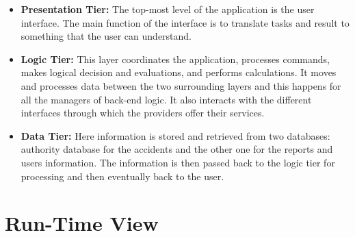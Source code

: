\documentclass[../RASD.tex]{subfiles}
\begin{document}
    \begin{itemize}
        \item \textbf{Presentation Tier:} The top-most level of the application is the user interface.
        The main function of the interface is to translate tasks and result to something that the user can understand.
        \item \textbf{Logic Tier:} This layer coordinates the application, processes commands, makes logical decision and evaluations, and performs calculations.
        It moves and processes data between the two surrounding layers and this happens for all the managers of back-end logic.
        It also interacts with the different interfaces through which the providers offer their services.
        \item \textbf{Data Tier:} Here information is stored and retrieved from two databases: authority database for the accidents and the other one
        for the reports and users information.
        The information is then passed back to the logic tier for processing and then eventually back to the user.
    \end{itemize}
    \newpage
    \section{Run-Time View}\label{sec:run-time-view}
\end{document}
